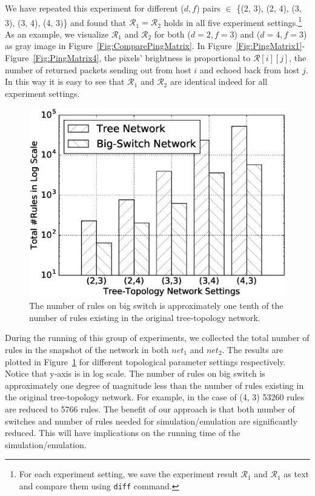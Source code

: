 We have repeated this experiment for different ($d, f$) pairs $\in$
\{(2, 3), (2, 4), (3, 3), (3, 4), (4, 3)\} and found that
$\mathcal{R}_1 = \mathcal{R}_2$ holds in all five experiment settings.\footnote{For each
experiment setting, we save the experiment result $\mathcal{R}_1$ and $\mathcal{R}_1$
as text and compare them using \texttt{diff} command.}
As an example, we visualize $\mathcal{R}_1$ and $\mathcal{R}_2$ for both ($d=2, f=3$)
and ($d=4, f=3$) as gray image in Figure~\ref{Fig:ComparePingMatrix}.
In Figure~\ref{Fig:PingMatrix1}-Figure~\ref{Fig:PingMatrix4},
the pixels' brightness is proportional to $\mathcal{R}[i][j]$,
the number of returned packets sending out from host $i$ and echoed back from host $j$.
In this way it is easy to see that $\mathcal{R}_1$ and $\mathcal{R}_2$ are identical
indeed for all experiment settings.


\begin{figure}[h]
\centering
\includegraphics[scale=.42]{figures/comp_num_rules.eps}
\caption{The number of rules on big switch is approximately one tenth of the
        number of rules existing in the original tree-topology network.}
\label{Fig:CompareNumRules}
\end{figure}

During the running of this group of experiments,
we collected the total number of rules in the snapshot of the network in both $net_1$
and $net_2$.
The results are plotted in Figure~\ref{Fig:CompareNumRules} for different
topological parameter settings respectively.
Notice that y-axis is in log scale.
The number of rules on big switch is approximately one degree of magnitude less
than the number of rules existing in the original tree-topology network.
For example, in the case of (4, 3) 53260 rules are reduced to 5766 rules.
The benefit of our approach is that both number of switches and number of rules needed
for simulation/emulation are significantly reduced.
This will have implications on the running time of the simulation/emulation.

